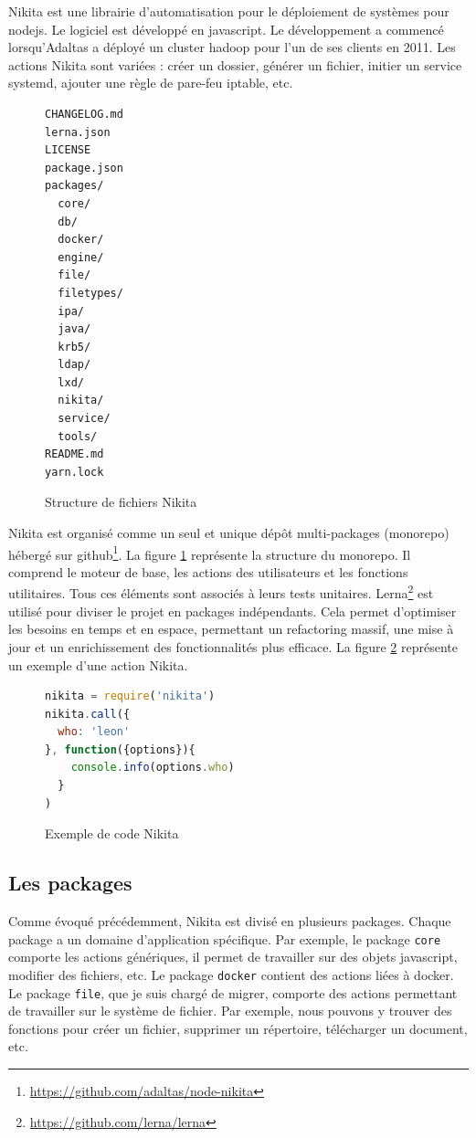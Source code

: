 \documentclass[12pt, french]{report}
\begin{document}
Nikita est une librairie d’automatisation pour le déploiement de systèmes pour \gls{nodejs}. Le logiciel est développé en \gls{javascript}. Le développement a commencé lorsqu'Adaltas a déployé un cluster \gls{hadoop} pour l’un de ses clients en 2011. Les actions Nikita sont variées : créer un dossier, générer un fichier, initier un service systemd, ajouter une règle de pare-feu iptable, etc.

\begin{figure}[h]
\begin{verbatim}
CHANGELOG.md
lerna.json
LICENSE
package.json
packages/
  core/
  db/
  docker/
  engine/
  file/
  filetypes/
  ipa/
  java/
  krb5/
  ldap/
  lxd/
  nikita/
  service/
  tools/
README.md
yarn.lock
\end{verbatim}
\centering
\caption{Structure de fichiers Nikita}
\label{fig:nikitaFileStructure}
\end{figure}

Nikita est organisé comme un seul et unique dépôt multi-packages (monorepo) hébergé sur \gls{github}\footnote{\href{https://github.com/adaltas/node-nikita}{https://github.com/adaltas/node-nikita}}. La figure \ref{fig:nikitaFileStructure} représente la structure du monorepo. Il comprend le moteur de base, les actions des utilisateurs et les fonctions utilitaires. Tous ces éléments sont associés à leurs tests unitaires. Lerna\footnote{\href{https://github.com/lerna/lerna}{https://github.com/lerna/lerna}} est utilisé pour diviser le projet en packages indépendants. Cela permet d'optimiser les besoins en temps et en espace, permettant un refactoring massif, une mise à jour et un enrichissement des fonctionnalités plus efficace. La figure \ref{code:example} représente un exemple d'une action Nikita.

\begin{figure}[H]
\begin{lstlisting}[language=JavaScript]
nikita = require('nikita')
nikita.call({
  who: 'leon'
}, function({options}){
    console.info(options.who)
  }
)
\end{lstlisting}
\centering
\caption{Exemple de code Nikita}
\label{code:example}
\end{figure}

\subsection{Les packages}

Comme évoqué précédemment, Nikita est divisé en plusieurs packages. Chaque package a un domaine d'application spécifique. Par exemple, le package \texttt{core} comporte les actions génériques, il permet de travailler sur des objets \gls{javascript}, modifier des fichiers, etc. Le package \texttt{docker} contient des actions liées à \gls{docker}. Le package \texttt{file}, que je suis chargé de migrer, comporte des actions permettant de travailler sur le système de fichier. Par exemple, nous pouvons y trouver des fonctions pour créer un fichier, supprimer un répertoire, télécharger un document, etc.
\end{document}
